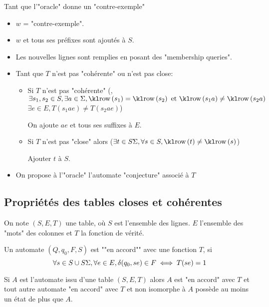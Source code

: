 Tant que l'"oracle" donne un "contre-exemple"
\begin{itemize}
	\item $w$ = "contre-exemple".
	\item $w$ et tous ses préfixes sont ajoutés à $S$.
	\item Les nouvelles lignes sont remplies en posant des "membership queries".
	\item Tant que $T$ n'est pas "cohérente" ou n'est pas close:
	      \begin{itemize}
		      \item Si $T$ n'est pas "cohérente" (\cad, $\exists s_1, s_2 \in S, \exists a \in \alphabet, \row{s_1} = \row{s_2} \et \row{s_1a} \neq \row{s_2a}$
		            \cad $\exists e \in E, T (s_1ae) \neq T(s_2ae)$)

		            On ajoute $ae$ et tous ses suffixes à $E$.
		      \item Si $T$ n'est pas "close" alors ($\exists t \in S \alphabet, \forall s \in S, \row t \neq \row s$)

		            Ajouter $t$ à $S$.
	      \end{itemize}
	\item On propose à l'"oracle" l'automate "conjecture" associé à $T$
\end{itemize}

\subsection{Propriétés des tables closes et cohérentes}

\begin{notation}
	On note $(S,E,T)$ une table, où $S$ est l'ensemble des lignes. $E$ l'ensemble des "mots" des colonnes et $T$ la fonction de vérité.
\end{notation}

\begin{definition}
	Un automate $(Q, q_0, F, S)$ est ""en accord"" avec une fonction $T$, si
	$$ \forall s \in S \cup S\Sigma, \forall e \in E, \delta(q_0,se) \in F \iff T(se) = 1$$
\end{definition}

\begin{theorem}
	Si $A$ est l'automate issu d'une table $(S,E,T)$ alors $A$ est "en accord" avec $T$ et tout autre
	automate "en accord" avec $T$ et non isomorphe à $A$ possède au moins un état de plus que $A$.
\end{theorem}

